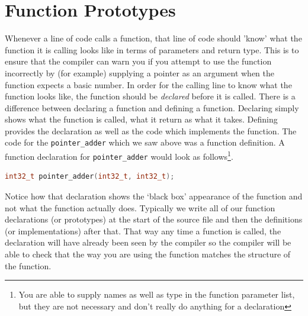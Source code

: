 \section{Function Prototypes}
Whenever a line of code calls a function, that line of code should 'know' what the function it is calling looks like in terms of parameters and return type. 
This is to ensure that the compiler can warn you if you attempt to use the function incorrectly by (for example) supplying a pointer as an argument when the function expects a basic number.
In order for the calling line to know what the function looks like, the function should be \emph{declared} before it is called.
There is a difference between declaring a function and defining a function. 
Declaring simply shows what the function is called, what it return as what it takes.
Defining provides the declaration as well as the code which implements the function. 
The code for the \texttt{pointer\_adder} which we saw above was a function definition. A function declaration for \texttt{pointer\_adder} would look as follows\footnote{You are able to supply names as well as type in the function parameter list, but they are not necessary and don't really do anything for a declaration}.

\begin{lstlisting}[language=c]
int32_t pointer_adder(int32_t, int32_t);
\end{lstlisting}

Notice how that declaration shows the `black box' appearance of the function and not what the function actually does.
Typically we write all of our function declarations (or prototypes) at the start of the source file and then the definitions (or implementations) after that. 
That way any time a function is called, the declaration will have already been seen by the compiler so the compiler will be able to check that the way you are using the function matches the structure of the function.

